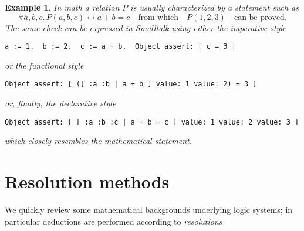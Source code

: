 \documentclass[a4paper,12pt]{article}
\newtheorem{example}[theorem]{Example}
\begin{document}
\begin{example}
In math a relation $P$ is usually characterized by a statement such as
\begin{displaymath}
\forall a,b,c.\,P(a,b,c) \leftrightarrow a + b = c \quad\text{from which}\quad
P(1,2,3) \quad\text{can be proved.}
\end{displaymath}
The same check can be expressed in Smalltalk using either the
\textit{imperative style}
\begin{verbatim}
a := 1.  b := 2.  c := a + b.  Object assert: [ c = 3 ]
\end{verbatim}
or the \textit{functional style}
\begin{verbatim}
Object assert: [ ([ :a :b | a + b ] value: 1 value: 2) = 3 ]
\end{verbatim}
or, finally, the \textit{declarative style}
\begin{verbatim}
Object assert: [ [ :a :b :c | a + b = c ] value: 1 value: 2 value: 3 ]
\end{verbatim}
which closely resembles the mathematical statement.
\end{example}

\section{Resolution methods}

We quickly review some mathematical backgrounds underlying logic systems;
in particular deductions are performed according to \emph{resolutions}
\end{document}
